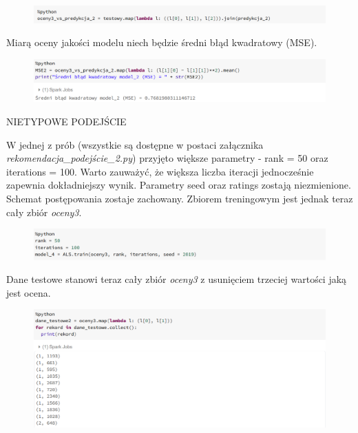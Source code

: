 \documentclass[12pt,a4paper]{report}
\begin{document}
\begin{figure}[H]
\includegraphics[scale=0.5]{obrazy/ALS11.PNG} 
\end{figure}

Miarą oceny jakości modelu niech będzie średni błąd kwadratowy (MSE).

\begin{figure}[H]
\includegraphics[scale=0.5]{obrazy/ALS12.PNG} 
\end{figure}

NIETYPOWE PODEJŚCIE

W jednej z prób (wszystkie są dostępne w postaci załącznika \textit{rekomendacja\_podejście\_2.py}) przyjęto większe parametry - rank = 50 oraz iterations = 100. Warto zauważyć, że większa liczba iteracji jednocześnie zapewnia dokładniejszy wynik. Parametry seed oraz ratings zostają niezmienione. Schemat postępowania zostaje zachowany. Zbiorem treningowym jest jednak teraz cały zbiór \textit{oceny3}.

\begin{figure}[H]
\includegraphics[scale=0.5]{obrazy/ALS13.PNG} 
\end{figure}

Dane testowe stanowi teraz cały zbiór \textit{oceny3} z usunięciem trzeciej wartości jaką jest ocena.

\begin{figure}[H]
\includegraphics[scale=0.5]{obrazy/ALS14.PNG} 
\end{figure}
\end{document}
